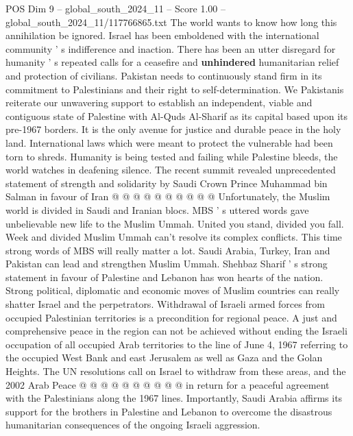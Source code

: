 \begin{textsample}{POS Dim 9 – global\_south\_2024\_11 – Score 1.00 – global\_south\_2024\_11/117766865.txt}
The world wants to know how long this annihilation be ignored.
Israel has been emboldened with the international community ' s indifference and inaction.
There has been an utter disregard for humanity ' s repeated calls for a ceasefire and \textbf{unhindered} humanitarian relief and protection of civilians.
Pakistan needs to continuously stand firm in its commitment to Palestinians and their right to self-determination.
We Pakistanis reiterate our unwavering support to establish an independent, viable and contiguous state of Palestine with Al-Quds Al-Sharif as its capital based upon its pre-1967 borders.
It is the only avenue for justice and durable peace in the holy land.
International laws which were meant to protect the vulnerable had been torn to shreds.
Humanity is being tested and failing while Palestine bleeds, the world watches in deafening silence.
The recent summit revealed unprecedented statement of strength and solidarity by Saudi Crown Prince Muhammad bin Salman in favour of Iran @ @ @ @ @ @ @ @ @ @ Unfortunately, the Muslim world is divided in Saudi and Iranian blocs.
MBS ' s uttered words gave unbelievable new life to the Muslim Ummah.
United you stand, divided you fall.
Week and divided Muslim Ummah can't resolve its complex conflicts.
This time strong words of MBS will really matter a lot.
Saudi Arabia, Turkey, Iran and Pakistan can lead and strengthen Muslim Ummah.
Shehbaz Sharif ' s strong statement in favour of Palestine and Lebanon has won hearts of the nation.
Strong political, diplomatic and economic moves of Muslim countries can really shatter Israel and the perpetrators.
Withdrawal of Israeli armed forces from occupied Palestinian territories is a precondition for regional peace.
A just and comprehensive peace in the region can not be achieved without ending the Israeli occupation of all occupied Arab territories to the line of June 4, 1967 referring to the occupied West Bank and east Jerusalem as well as Gaza and the Golan Heights.
The UN resolutions call on Israel to withdraw from these areas, and the 2002 Arab Peace @ @ @ @ @ @ @ @ @ @ in return for a peaceful agreement with the Palestinians along the 1967 lines.
Importantly, Saudi Arabia affirms its support for the brothers in Palestine and Lebanon to overcome the disastrous humanitarian consequences of the ongoing Israeli aggression.

\end{textsample}
